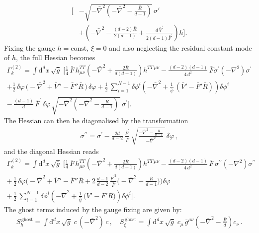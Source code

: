 \documentclass[11pt]{book} %
\newcommand{\rad}{\psi}
\numberwithin{equation}{chapter}
\begin{document}
{\begin{appendices}
\begin{align}
  \bigg[
    &- \sqrt{-\bar{\nabla}^2\left(-\bar{\nabla}^2-\frac{\bar{R}}{d-1}\right)} \, \sigma' \nonumber \\
    &+
    \left(
      -\bar{\nabla}^2
      -\frac{(d-2) \bar{R}}{2(d-1)}
      +\frac{d\,\bar{V}^{\prime}}{2(d-1)\bar{F}^{\prime}}
    \right)
    h
  \bigg] .
\end{align}
Fixing the gauge $h = \text{const}$, $\xi=0$ and also neglecting the residual constant mode of $h$,
the full Hessian becomes
\begin{align}
  \Gamma_k^{(2)} = \int \mathrm d^d x \, \sqrt{\bar{g}} \;
  \Bigg[
    \frac{1}{4} \, \bar{F} \, h^{TT}_{\mu\nu} \left( -\bar{\nabla}^2 + \frac{2 \bar{R}}{d(d-1)} \right) h^{TT\,\mu\nu}
    - \frac{(d-2)(d-1)}{4\,d^2} \, \bar{F} \sigma^{\prime} (-\nabla^2) \sigma^{\prime}
    \nonumber\\
    +\frac{1}{2} \, \delta\varphi \, \Big( -\bar\nabla^2 + \bar V'' - \bar F''\bar{R} \, \Big) \, \delta\varphi
    +\frac{1}{2} \, \sum_{i=1}^{N-1} \delta\phi^i
    \left(-\bar\nabla^2
    +\frac{1}{\bar\rad} \, (\bar V'-\bar F'\bar{R})\right) \delta\phi^i
    \nonumber \\
    - \,   \frac{(d-1)}{d} \, \bar{F}^{\prime} \, \delta\varphi \,
    \sqrt{-\bar{\nabla}^2\left(-\bar{\nabla}^2-\frac{\bar{R}}{d-1}\right) \, } \, \sigma^{\prime}
  \Bigg] .
  \label{oldHessian}
\end{align}
The Hessian can then be diagonalised by the transformation
\begin{align}
  \sigma^{\prime\prime} = \sigma^{\prime}
  -\frac{2d}{d-2} \, \frac{\bar{F}^{\prime}}{\bar{F}}  \, \sqrt{\frac{-\bar{\nabla}^2-\frac{\bar{R}}{d-1}}{-\bar{\nabla}^2} \, } \, \delta\varphi\,,
\end{align}
and the diagonal Hessian reads
\begin{align}
  \Gamma_k^{(2)} = \int \mathrm{d}^d x \, \sqrt{\bar{g}} \;
  \Bigg[
    \frac{1}{4}\,\bar{F}\, h^{TT}_{\mu\nu} \left( -\bar{\nabla}^2
    + \frac{2 \bar{R}}{d(d-1)} \right) h^{TT\,\mu\nu}
    - \frac{(d-2)(d-1)}{4\,d^2} \, \bar{F} \, \sigma^{\prime\prime} (-\nabla^2) \sigma^{\prime\prime}
    \nonumber\\
    +\, \frac{1}{2} \, \delta\varphi
    \bigg(
      - \bar\nabla^2 + \bar V'' - \bar F'' \bar R
      + 2 \, \frac{d-1}{d-2} \, \frac{\bar{F}^{\prime 2}}{\bar{F}}
      \bigg(
        -\bar{\nabla}^2 - \frac{\bar{R}}{d-1}
      \bigg)
    \bigg) \delta\varphi \nonumber \\
    +\,\frac{1}{2} \, \sum_{i=1}^{N-1} \delta\phi^i
    \left( -\bar\nabla^2
    +\frac{1}{\bar\rad} \, \big( \bar V'-\bar F'\bar{R} \big)\right)\delta\phi^i
  \Bigg] .
  \label{hessfinal}
\end{align}
The ghost terms induced by the gauge fixing are given by:
\begin{align}
  S^{\,\mathrm{ghost}}_{h} = \int \mathrm d^dx \, \sqrt{\bar g} \; c \, (-\bar\nabla^2) \, c \,,
  \quad
  S^{\,\mathrm{ghost}}_{\xi} = \int \mathrm d^dx \, \sqrt{\bar g} \;  c_\mu \, \bar g^{\mu\nu}
  \left(-\bar\nabla^2-\frac{\bar R}{d}\right) c_\nu \,.
  \label{ghosts}
\end{align}


\end{appendices}}
\end{document}
